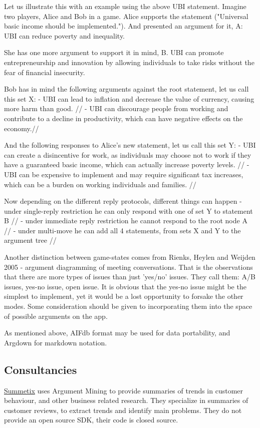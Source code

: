 \documentclass{report}
\begin{document}
Let us illustrate this with an example using the above UBI statement. Imagine two players, Alice and Bob in a game.
Alice supports the statement ("Universal basic income should be implemented."). And presented an argument for it, A:
UBI can reduce poverty and inequality.


She has one more argument to support it in mind, B.
UBI can promote entrepreneurship and innovation by allowing individuals to take risks without the fear of financial insecurity.

Bob has in mind the following arguments against the root statement, let us call this set X:
- UBI can lead to inflation and decrease the value of currency, causing more harm than good. //
- UBI can discourage people from working and contribute to a decline in productivity, which can have  negative effects on the economy.//

And the following responses to Alice's new statement, let us call this set Y:
- UBI can create a disincentive for work, as individuals may choose not to work if they have a guaranteed basic income, which can actually increase poverty levels. //
- UBI can be expensive to implement and may require significant tax increases, which can be a burden on working individuals and families. //

Now depending on the different reply protocols, different things can happen
- under single-reply restriction he can only respond with one of set Y to statement B //
- under immediate reply restriction he cannot respond to the root node A //
- under multi-move he can add all 4 statements, from sets X and Y to the argument tree //

Another distinction between game-states comes from Rienks, Heylen and Weijden 2005 - argument diagramming of meeting conversations.
That is the observations that there are more types of issues than just 'yes/no' issues.
They call them: A/B issues, yes-no issue, open issue.
It is obvious that the yes-no issue might be the simplest to implement, yet it would be a lost opportunity to forsake the other modes.
Some consideration should be given to incorporating them into the space of possible arguments on the app.

As mentioned above, AIFdb format may be used for data portability, and Argdown for markdown notation.


\subsection{Consultancies}
\href{https://www.summetix.com/}{Summetix} uses Argument Mining to provide summaries of trends in customer behaviour, and other business related research. They specialize in summaries of customer reviews, to extract trends and identify main problems. They do not provide an open source SDK, their code is closed source.
\end{document}
